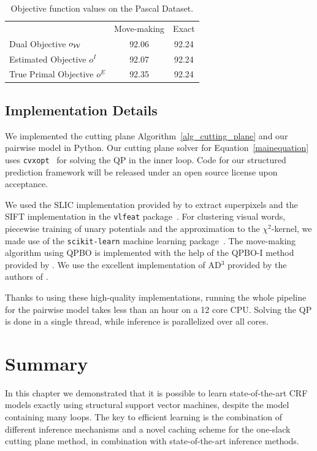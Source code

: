 \begin{table}
    \begin{center}
    \begin{tabularx}{\linewidth}{@{\extracolsep{\fill}}lcc}
    \toprule
                    & Move-making & Exact \\
    \cmidrule{1-3}
    Dual Objective $o_{\mathcal{W}}$ &92.06& 92.24\\
    Estimated Objective $o^I$ & 92.07 &92.24\\
    True Primal Objective $o^E$&92.35& 92.24  \\
    \bottomrule
    \end{tabularx}
    \end{center}
    \caption{Objective function values on the Pascal Dataset.}
    \label{pascal_objective}
\end{table}


\subsection{Implementation Details}
We implemented the cutting plane Algorithm~\ref{alg_cutting_plane} and our pairwise
model in Python.
Our cutting plane solver for Equation~\eqref{mainequation} uses
\texttt{cvxopt}~\citep{dahl2006cvxopt} for solving the QP in the inner loop. Code for
our structured prediction framework will be released under an open source
license upon acceptance.

We used the SLIC implementation provided by \citet{achanta2012slic} to extract superpixels and
the SIFT implementation in the \texttt{vlfeat} package~\citep{vedaldi08vlfeat}.
For clustering visual words, piecewise training of unary potentials and the
approximation to the $\chi^2$-kernel, we made use of the \texttt{scikit-learn}
machine learning package~\citep{pedregosa2011scikit}.
The move-making algorithm using QPBO is implemented with the help of the QPBO-I
method provided by \citet{rother2007optimizing}.
We use the excellent implementation of AD$^3$ provided by the authors of
\citet{martins2011augmented}. 

Thanks to using these high-quality implementations, running the whole pipeline
for the pairwise model takes less than an hour on a 12 core CPU\@. Solving the
QP is done in a single thread, while inference is parallelized over all cores.
 
\section{Summary}
In this chapter we demonstrated that it is possible to learn state-of-the-art CRF models
exactly using structural support vector machines, despite the model containing many loops.
The key to efficient learning is the combination of different inference mechanisms and
a novel caching scheme for the one-slack cutting plane method, in combination
with state-of-the-art inference methods.

